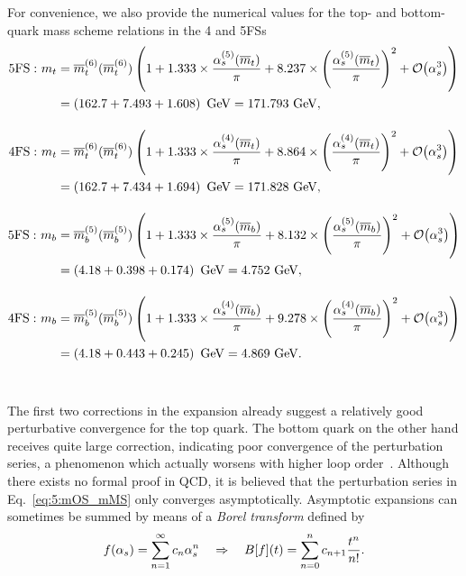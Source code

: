 For convenience, we also provide the numerical values for the top- and bottom-quark mass scheme relations in the 4 and 5\acs{FS}s
\begin{align}
\mathrm{5FS: }\ m_t &= \overline{m}^{(6)}_t(\overline{m}^{(6)}_t) \left(1 +  1.333 \times \frac{\alphas^{(5)}(\overline{m}_t)}{\pi} + 8.237 \times \left(\frac{\alphas^{(5)}(\overline{m}_t)}{\pi}\right)^2 + \BigO{\alphas^3} \right) \notag \\
&= \left(162.7 + 7.493 + 1.608 \right) \ \mathrm{GeV} = 171.793 \ \mathrm{GeV},  \label{eq:5:mtOS_mtMS_5FS} \\[10pt]
\mathrm{4FS: }\ m_t &= \overline{m}^{(6)}_t(\overline{m}^{(6)}_t) \left(1 +  1.333 \times \frac{\alphas^{(4)}(\overline{m}_t)}{\pi} + 8.864 \times \left(\frac{\alphas^{(4)}(\overline{m}_t)}{\pi}\right)^2 + \BigO{\alphas^3} \right) \notag \\
&= \left(162.7 + 7.434 + 1.694 \right) \ \mathrm{GeV} = 171.828\ \mathrm{GeV},  \label{eq:5:mtOS_mtMS_4FS} \\[10pt]
\mathrm{5FS: }\ m_b &= \overline{m}^{(5)}_b(\overline{m}^{(5)}_b) \left(1 +  1.333 \times \frac{\alphas^{(5)}(\overline{m}_b)}{\pi} + 8.132 \times \left(\frac{\alphas^{(5)}(\overline{m}_b)}{\pi}\right)^2 + \BigO{\alphas^3} \right) \notag \\
&= \left(4.18 + 0.398 + 0.174 \right) \ \mathrm{GeV} = 4.752\ \mathrm{GeV},  \label{eq:5:mbOS_mbMS_5FS} \\[10pt]
\mathrm{4FS: }\ m_b &= \overline{m}^{(5)}_b(\overline{m}^{(5)}_b) \left(1 +  1.333 \times \frac{\alphas^{(4)}(\overline{m}_b)}{\pi} + 9.278 \times \left(\frac{\alphas^{(4)}(\overline{m}_b)}{\pi}\right)^2 + \BigO{\alphas^3} \right) \notag \\
&= \left(4.18 + 0.443 + 0.245 \right) \ \mathrm{GeV} = 4.869\ \mathrm{GeV}. \label{eq:5:mbOS_mbMS_4FS} \\[10pt] \notag
\end{align}
The first two corrections in the expansion already suggest a relatively good perturbative convergence for the top quark. The bottom quark on the other hand receives quite large correction, indicating poor convergence of the perturbation series, a phenomenon which actually worsens with higher loop order~\cite{Marquard:2015qpa,Marquard:2016vmy}. Although there exists no formal proof in \acs{QCD}, it is believed that the perturbation series in Eq.~\eqref{eq:5:mOS_mMS} only converges asymptotically. Asymptotic expansions can sometimes be summed by means of a \textit{Borel transform} defined by
\begin{equation}
f(\alpha_s) = \sum_{n = 1}^\infty c_n \alpha_s^n \quad \Rightarrow \quad B[f](t) = \sum_{n = 0}^n c_{n + 1} \frac{t^n}{n!}.
\end{equation}

